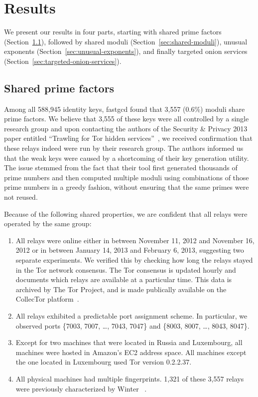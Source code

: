 \section{Results}
\label{sec:results}
We present our results in four parts, starting with shared prime factors
(Section~\ref{sec:shared-primes}), followed by shared moduli
(Section~\ref{sec:shared-moduli}), unusual exponents 
(Section~\ref{sec:unusual-exponents}), and finally targeted onion services
(Section~\ref{sec:targeted-onion-services}).

\subsection{Shared prime factors}
\label{sec:shared-primes}
Among all 588,945 identity keys, fastgcd found that 3,557 (0.6\%)
moduli share prime factors.  We believe that 3,555 of these keys were all
controlled by a single research group and upon contacting the authors of the
Security \& Privacy 2013 paper entitled ``Trawling for Tor hidden
services''~\cite{Biryukov2013a}, we received confirmation that these relays
indeed were run by their research group.  The authors informed us that the weak
keys were caused by a shortcoming of their key generation utility. The issue
stemmed from the fact that their tool first generated thousands of prime numbers
and then computed multiple moduli using combinations of those prime numbers in a
greedy fashion, without ensuring that the same primes were not reused.

Because of the following shared properties, we are confident that all relays
were operated by the same group:

\begin{enumerate}
	\item All relays were online either in between November 11, 2012 and
		November 16, 2012 or in between January 14, 2013 and February 6, 2013,
		suggesting two separate experiments. We verified this by checking how
		long the relays stayed in the Tor network consensus. The Tor consensus
		is updated hourly and documents which relays are available at a
		particular time. This data is archived by The Tor Project, and is made
		publically available on the CollecTor platform~\cite{collector}.

	\item All relays exhibited a predictable port assignment scheme.  In
		particular, we observed ports \{7003, 7007, \dots, 7043, 7047\} and
		\{8003, 8007, \dots, 8043, 8047\}.

	\item Except for two machines that were located in Russia and Luxembourg,
		all machines were hosted in Amazon's EC2 address space.  All machines
		except the one located in Luxembourg used Tor version 0.2.2.37.

	\item All physical machines had multiple fingerprints.  1,321 of these 3,557
		relays were previously characterized by Winter
		\ea~\cite[\S~5.1]{Winter2016a}.
\end{enumerate}

